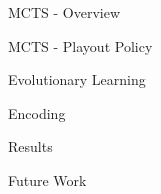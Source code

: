 \documentclass{beamer}
\begin{document}
\begin{frame}{MCTS - Overview}
\end{frame}

\begin{frame}{MCTS - Playout Policy}
\end{frame}

\begin{frame}{Evolutionary Learning}
\end{frame}

\begin{frame}{Encoding}
\end{frame}

\begin{frame}{Results}
\end{frame}

\begin{frame}{Future Work}
\end{frame}
\end{document}
